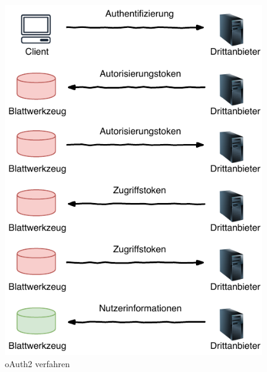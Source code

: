 \begin{figure}[h]
	\centering
	\includegraphics[width=.55\textwidth]{graphics/oauth2.pdf}
	\caption{oAuth2 verfahren}
	\label{fig:oauth2}
\end{figure}